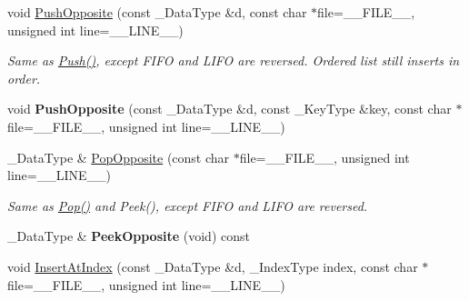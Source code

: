 \begin{DoxyCompactItemize}
\item 
\hypertarget{class_data_structures_1_1_multilist_a1596f547cb2b038726d2d733930e44be}{void \hyperlink{class_data_structures_1_1_multilist_a1596f547cb2b038726d2d733930e44be}{Push\-Opposite} (const \-\_\-\-Data\-Type \&d, const char $\ast$file=\-\_\-\-\_\-\-F\-I\-L\-E\-\_\-\-\_\-, unsigned int line=\-\_\-\-\_\-\-L\-I\-N\-E\-\_\-\-\_\-)}\label{class_data_structures_1_1_multilist_a1596f547cb2b038726d2d733930e44be}

\begin{DoxyCompactList}\small\item\em Same as \hyperlink{class_data_structures_1_1_multilist_afe3f119b9f715a88fc6dd356689f7e72}{Push()}, except F\-I\-F\-O and L\-I\-F\-O are reversed. Ordered list still inserts in order. \end{DoxyCompactList}\item 
\hypertarget{class_data_structures_1_1_multilist_a813d673f3e74d35e078355e2652335ad}{void {\bfseries Push\-Opposite} (const \-\_\-\-Data\-Type \&d, const \-\_\-\-Key\-Type \&key, const char $\ast$file=\-\_\-\-\_\-\-F\-I\-L\-E\-\_\-\-\_\-, unsigned int line=\-\_\-\-\_\-\-L\-I\-N\-E\-\_\-\-\_\-)}\label{class_data_structures_1_1_multilist_a813d673f3e74d35e078355e2652335ad}

\item 
\hypertarget{class_data_structures_1_1_multilist_a5788e4bea29895d318226b5b943d5954}{\-\_\-\-Data\-Type \& \hyperlink{class_data_structures_1_1_multilist_a5788e4bea29895d318226b5b943d5954}{Pop\-Opposite} (const char $\ast$file=\-\_\-\-\_\-\-F\-I\-L\-E\-\_\-\-\_\-, unsigned int line=\-\_\-\-\_\-\-L\-I\-N\-E\-\_\-\-\_\-)}\label{class_data_structures_1_1_multilist_a5788e4bea29895d318226b5b943d5954}

\begin{DoxyCompactList}\small\item\em Same as \hyperlink{class_data_structures_1_1_multilist_a09e7c33fe9587c1902ed1551d720f7b7}{Pop()} and Peek(), except F\-I\-F\-O and L\-I\-F\-O are reversed. \end{DoxyCompactList}\item 
\hypertarget{class_data_structures_1_1_multilist_a014b1c5251d11ee2a51e6fac42fac019}{\-\_\-\-Data\-Type \& {\bfseries Peek\-Opposite} (void) const }\label{class_data_structures_1_1_multilist_a014b1c5251d11ee2a51e6fac42fac019}

\item 
\hypertarget{class_data_structures_1_1_multilist_a2192553f7ca8b678719cef4643d0d143}{void \hyperlink{class_data_structures_1_1_multilist_a2192553f7ca8b678719cef4643d0d143}{Insert\-At\-Index} (const \-\_\-\-Data\-Type \&d, \-\_\-\-Index\-Type index, const char $\ast$file=\-\_\-\-\_\-\-F\-I\-L\-E\-\_\-\-\_\-, unsigned int line=\-\_\-\-\_\-\-L\-I\-N\-E\-\_\-\-\_\-)}\label{class_data_structures_1_1_multilist_a2192553f7ca8b678719cef4643d0d143}


\end{DoxyCompactItemize}
